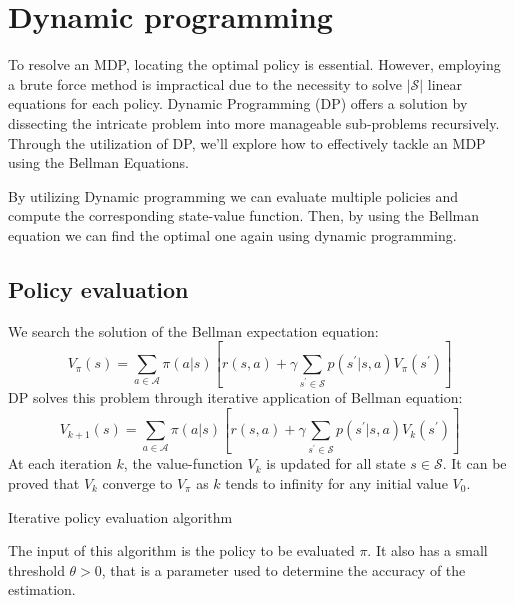 \section{Dynamic programming}

To resolve an MDP, locating the optimal policy is essential. 
However, employing a brute force method is impractical due to the necessity to solve $\left\lvert \mathcal{S}\right\rvert $ linear equations for each policy. 
Dynamic Programming (DP) offers a solution by dissecting the intricate problem into more manageable sub-problems recursively. 
Through the utilization of DP, we'll explore how to effectively tackle an MDP using the Bellman Equations.

By utilizing Dynamic programming we can evaluate multiple policies and compute the corresponding state-value function. 
Then, by using the Bellman equation we can find the optimal one again using dynamic programming. 

\subsection{Policy evaluation}
We search the solution of the Bellman expectation equation:
\[V_{\pi}(s)=\sum_{a\in\mathcal{A}}\pi(a|s)\left[r(s,a)+\gamma\sum_{s^\prime\in\mathcal{S}}p(s^\prime|s,a)V_{\pi}(s^\prime)\right]\]
DP solves this problem through iterative application of Bellman equation:
\[V_{k+1}(s)=\sum_{a\in\mathcal{A}}\pi(a|s)\left[r(s,a)+\gamma\sum_{s^\prime\in\mathcal{S}}p(s^\prime|s,a)V_{k}(s^\prime)\right]\]
At each iteration $k$, the value-function $V_k$ is updated for all state $s\in\mathcal{S}$.
It can be proved that $V_k$ converge to $V_{\pi}$ as $k$ tends to infinity for any initial value $V_0$. 
\begin{algorithm}[H]
    \caption{Iterative policy evaluation algorithm}
        \begin{algorithmic}[1]
            \Repeat 
                \EndFor
            \Until{$\Delta<\theta$}
        \end{algorithmic}
\end{algorithm}
The input of this algorithm is the policy to be evaluated $\pi$. 
It also has a small threshold $\theta>0$, that is a parameter used to determine the accuracy of the estimation.

